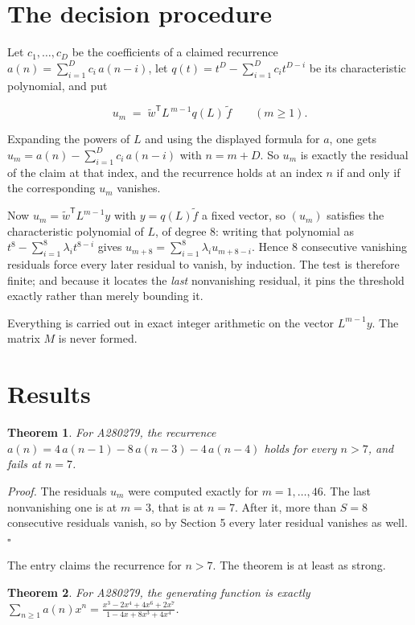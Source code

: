 \documentclass[11pt]{article}
\newtheorem{theorem}{Theorem}
\theoremstyle{definition}
\begin{document}
\section{The decision procedure}

Let $c_1,\dots,c_D$ be the coefficients of a claimed recurrence $a(n) = \sum_{i=1}^{D} c_i\,a(n-i)$, let $q(t) = t^{D} - \sum_{i=1}^{D} c_i t^{D-i}$ be its characteristic polynomial, and put

\[u_m \;=\; \tilde w^{\mathsf T} L^{\,m-1} q(L)\,\tilde f \qquad (m \ge 1).\]

Expanding the powers of $L$ and using the displayed formula for $a$, one gets $u_m = a(n) - \sum_{i=1}^{D} c_i\,a(n-i)$ with $n = m + D$. So $u_m$ is exactly the residual of the claim at that index, and the recurrence holds at an index $n$ if and only if the corresponding $u_m$ vanishes.

Now $u_m = \tilde w^{\mathsf T} L^{m-1} y$ with $y = q(L)\tilde f$ a fixed vector, so $(u_m)$ satisfies the characteristic polynomial of $L$, of degree $8$: writing that polynomial as $t^{8} - \sum_{i=1}^{8} \lambda_i t^{8-i}$ gives $u_{m+8} = \sum_{i=1}^{8} \lambda_i u_{m+8-i}$. Hence $8$ consecutive vanishing residuals force every later residual to vanish, by induction. The test is therefore finite; and because it locates the {\itshape last} nonvanishing residual, it pins the threshold exactly rather than merely bounding it.

Everything is carried out in exact integer arithmetic on the vector $L^{m-1}y$. The matrix $M$ is never formed.

\section{Results}

\begin{theorem} For A280279, the recurrence $a(n) = 4\,a(n-1) - 8\,a(n-3) - 4\,a(n-4)$ holds for every $n > 7$, and fails at $n = 7$.\end{theorem}

{\itshape Proof.} The residuals $u_m$ were computed exactly for $m = 1,\dots,46$. The last nonvanishing one is at $m = 3$, that is at $n = 7$. After it, more than $S = 8$ consecutive residuals vanish, so by Section 5 every later residual vanishes as well. $\square$

The entry claims the recurrence for $n > 7$. The theorem is at least as strong.

\begin{theorem} For A280279, the generating function is exactly $\sum_{n\ge 1} a(n)x^n = \frac{x^{3} - 2x^{4} + 4x^{6} + 2x^{7}}{1 - 4x + 8x^{3} + 4x^{4}}$.\end{theorem}
\end{document}
